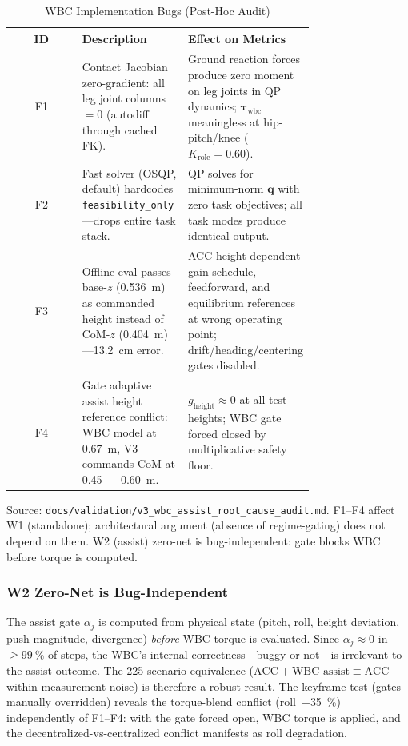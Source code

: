 \begin{table}[h]
\centering
\caption{WBC Implementation Bugs (Post-Hoc Audit)}
\label{tab:wbc_bugs}
\footnotesize
\begin{tabular}{@{}c>{\raggedright\arraybackslash}p{0.35\linewidth}>{\raggedright\arraybackslash}p{0.40\linewidth}@{}}
\toprule
ID & Description & Effect on Metrics \\
\midrule
F1 & Contact Jacobian zero-gradient: all leg joint columns~$=0$ (autodiff through cached FK). &
Ground reaction forces produce zero moment on leg joints in QP dynamics; $\boldsymbol{\tau}_{\text{wbc}}$ meaningless at hip-pitch/knee ($K_{\text{role}}{=}0.60$). \\
F2 & Fast solver (OSQP, default) hardcodes \texttt{feasibility\_only}---drops entire task stack. &
QP solves for minimum-norm $\ddot{\mathbf{q}}$ with zero task objectives; all task modes produce identical output. \\
F3 & Offline eval passes base-$z$ (\SI{0.536}{m}) as commanded height instead of CoM-$z$ (\SI{0.404}{m})---\SI{13.2}{cm} error. &
ACC height-dependent gain schedule, feedforward, and equilibrium references at wrong operating point; drift/heading/centering gates disabled. \\
F4 & Gate adaptive assist height reference conflict: WBC model at \SI{0.67}{m}, V3 commands CoM at \SI{0.45}{--}\SI{0.60}{m}. &
$g_{\text{height}} \approx 0$ at all test heights; WBC gate forced closed by multiplicative safety floor. \\
\bottomrule
\end{tabular}
\vspace{4pt}\par\noindent\footnotesize
Source: \texttt{docs/validation/v3\_wbc\_assist\_root\_cause\_audit.md}.
F1--F4 affect W1 (standalone); architectural argument (absence of regime-gating) does not depend on them.
W2 (assist) zero-net is bug-independent: gate blocks WBC before torque is computed.
\end{table}

\subsubsection{W2 Zero-Net is Bug-Independent}
The assist gate $\alpha_{\!j}$ is computed from physical state (pitch, roll, height deviation, push magnitude, divergence) \emph{before} WBC torque is evaluated.
Since $\alpha_{\!j} \approx 0$ in ${\ge}\SI{99}{\percent}$ of steps, the WBC's internal correctness---buggy or not---is irrelevant to the assist outcome.
The 225-scenario equivalence ($\text{ACC}+\text{WBC assist} \equiv \text{ACC}$ within measurement noise) is therefore a robust result.
The keyframe test (gates manually overridden) reveals the torque-blend conflict (roll~$+$\SI{35}{\percent}) independently of F1--F4: with the gate forced open, WBC torque is applied, and the decentralized-vs-centralized conflict manifests as roll degradation.
